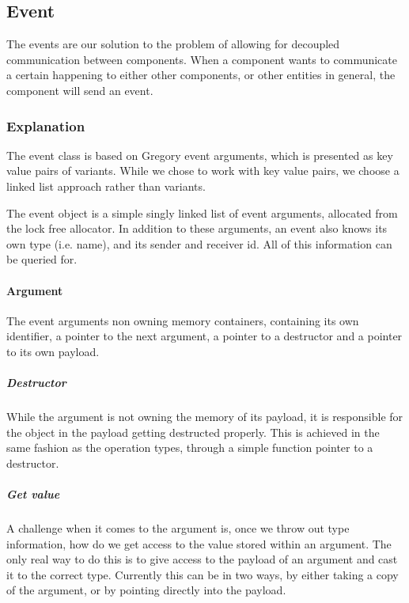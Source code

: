 \subsection{Event}
\label{subsec:detailed_event}
The events are our solution to the problem of allowing for decoupled communication
between components.
When a component wants to communicate a certain happening
to either other components, or other entities in general, the component will send an
event.


\subsubsection{Explanation}
The event class is based on Gregory\cite[p. 938]{game_engine_architecture} event arguments,
which is presented as key value pairs of variants. While we chose to work with key value pairs,
we choose a linked list approach rather than variants.

The event object is a simple singly linked list of event arguments, allocated from
the lock free allocator.
In addition to these arguments, an event also knows its own type (i.e. name),
and its sender and receiver id. All of this information can be queried for.

\paragraph{Argument}
The event arguments non owning memory containers, containing its own identifier,
a pointer to the next argument, a pointer to a destructor and a pointer to its own payload.

\subparagraph{Destructor}
While the argument is not owning the memory of its payload, it is responsible for the object
in the payload getting destructed properly.
This is achieved in the same fashion as the operation types,
through a simple function pointer to a destructor.

\subparagraph{Get value}
A challenge when it comes to the argument is, once we throw out type information, how do we
get access to the value stored within an argument.
The only real way to do this is to give access to the payload of an argument and cast it
to the correct type. Currently this can be in two ways, by either taking a copy of the argument,
or by pointing directly into the payload.

